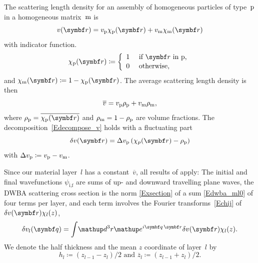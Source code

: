 The scattering length density for an assembly of homogeneous particles of type~$\sp$
in a homogeneous matrix~$\sm$ is
\begin{equation}
  v(\r) = v_\sp \chi_\sp(\r) + v_\sm \chi_\sm(\r)
\end{equation}
with indicator function.
\begin{equation}
  \chi_\sp(\r)\coloneqq\left\{\begin{array}{ll}
  1&\text{~if $\r$ in p,}\\[.2ex]
  0&\text{~otherwise,} \end{array}\right.
\end{equation}
%
%
and $\chi_\sm(\r)\coloneqq 1-\chi_\sp(\r)$.
The average scattering length density is then
\begin{equation}
  \overline{v} = v_\sp\rho_\sp + v_\sm\rho_\sm,
\end{equation}
where $\rho_\sp=\overline{\chi_\sp(\r)}$ and $\rho_\sm=1-\rho_\sp$
are volume fractions.
The decomposition~\cref{Edecompose_v} holds with a fluctuating part
\begin{equation}
  \delta v(\r) = \Delta v_\sp\left(\chi_p(\r)-\rho_\sp\right)
\end{equation}
with $\Delta v_\sp\coloneqq v_\sp-v_\sm$.

Since our material layer~$l$ has a constant~$\overline{v}$,
all results of  apply:
The initial and final wavefunctions $\psi_\text{i,f}$
are sums of up- and downward travelling plane waves,
the DWBA scattering cross section is the norm \cref{Exsection}
of a sum \cref{Edwba_ml0} of four terms per layer,
and each term involves the Fourier transforms~\cref{Echij}
of $\delta v(\r)\chi_l(z)$,
\begin{equation}
  \delta v_l(\q)
  = \int\!\d^3r \e^{i\v{q}\,\r}\delta v(\r) \chi_l(z).
\end{equation}
We denote the half thickness and the mean $z$ coordinate of layer~$l$ by
\begin{equation}
  h_l\coloneqq \left(z_{l-1}-z_l\right)/2
  \text{~and~}
  \overline{z}_l \coloneqq \left(z_{l-1}+z_l\right)/2.
\end{equation}

